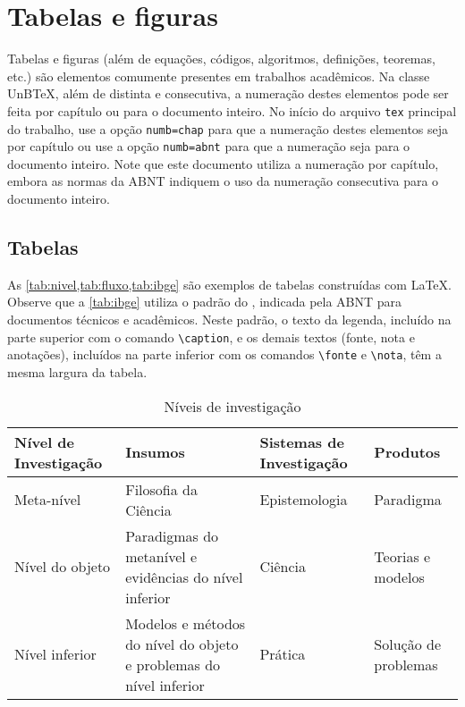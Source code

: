 \chapter{Tabelas e figuras}

Tabelas e figuras (além de equações, códigos, algoritmos, definições, teoremas, etc.) são elementos comumente presentes em trabalhos acadêmicos. Na classe UnB\TeX, além de distinta e consecutiva, a numeração destes elementos pode ser feita por capítulo ou para o documento inteiro. No início do arquivo \texttt{tex} principal do trabalho, use a opção \texttt{numb=chap} para que a numeração destes elementos seja por capítulo ou use a opção \texttt{numb=abnt} para que a numeração seja para o documento inteiro. Note que este documento utiliza a numeração por capítulo, embora as normas da ABNT indiquem o uso da numeração consecutiva para o documento inteiro.

\section{Tabelas}

As \cref{tab:nivel,tab:fluxo,tab:ibge} são exemplos de tabelas construídas com \LaTeX. Observe que a \cref{tab:ibge} utiliza o padrão do , indicada pela ABNT para documentos técnicos e acadêmicos. Neste padrão, o texto da legenda, incluído na parte superior com o comando \verb|\caption|, e os demais textos (fonte, nota e anotações), incluídos na parte inferior com os comandos \verb|\fonte| e \verb|\nota|, têm a mesma largura da tabela.

\begin{table}[htb]
\centering
\small
\caption[Níveis de investigação]{Níveis de investigação}
\label{tab:nivel}
{\renewcommand{\arraystretch}{1.3} %
\begin{tabular}{p{2.5cm}p{5.4cm}p{2.3cm}p{2.5cm}}
    \rowcolor{cinzafatec!10}\textbf{Nível de Investigação} & \textbf{Insumos}  & \textbf{Sistemas de Investigação}  & \textbf{Produtos} \\ \hline
    Meta-nível & Filosofia da Ciência  & Epistemologia & Paradigma \\ \hline
    Nível do objeto & Paradigmas do metanível e evidências do nível inferior & Ciência  & Teorias e modelos \\ \hline
    Nível inferior & Modelos e métodos do nível do objeto e problemas do nível inferior & Prática & Solução de problemas \\
\end{tabular}}
\end{table}

